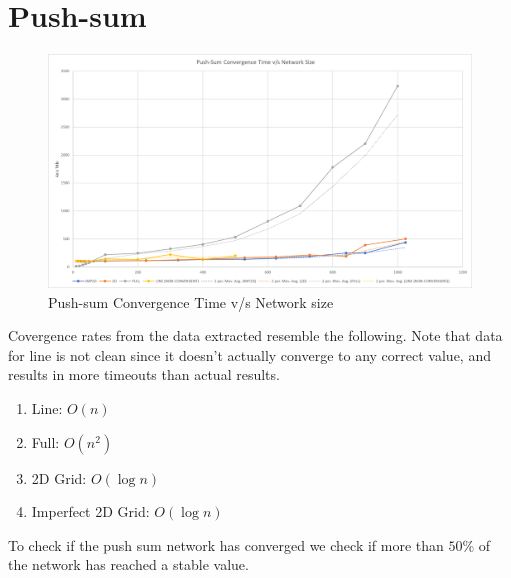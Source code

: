 \documentclass[a4paper, 10pt]{article}
\begin{document}
    \section{Push-sum}
    \begin{figure}[h]
      \caption{Push-sum Convergence Time v/s Network size}
      \includegraphics[width=\textwidth]{project2_psum_chart}
    \end{figure}

    Covergence rates from the data extracted resemble the following. Note that data for line is not clean since it doesn't actually converge to any correct value, and results in more timeouts than actual results.
    \begin{enumerate}
      \item{Line: $O(n)$}
      \item{Full: $O(n^2)$}
      \item{2D Grid: $O(\log n)$}
      \item{Imperfect 2D Grid: $O(\log n)$}
    \end{enumerate}

    To check if the push sum network has converged we check if more than $50\%$ of the network has reached a stable value.
\end{document}
